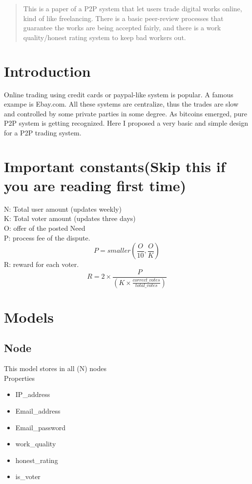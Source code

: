 \documentclass[12pt]{article}
\begin{document}
\maketitle

\begin{abstract}
This is a paper of a P2P system that let users trade digital works online, kind of like freelancing. There is a basic peer-review processes that guarantee the works are being accepted fairly, and there is a work quality/honest rating system to keep bad workers out. 
\end{abstract}

\section{Introduction}
Online trading using credit cards or paypal-like system is popular. A famous exampe is Ebay.com. All these systems are centralize, thus the trades are slow and controlled by some private parties in some degree. As bitcoins emerged, pure P2P system is getting recognized. Here I proposed a very basic and simple design for a P2P trading system. 

\section{Important constants(Skip this if you are reading first time)}
N: Total user amount (updates weekly)\\
K: Total voter amount (updates three days)\\
O: offer of the posted Need\\
P: process fee of the dispute. 
\[
P = smaller(\frac{O}{10}, \frac{O}{K})
\]
R: reward for each voter. 
\[
R = 2 \times \frac{P}{(K \times \frac{correct\_votes}{total\_votes})}
\]

\section{Models}

\subsection{Node}
This model stores in all (N) nodes\\
Properties
\begin{itemize}
	\item IP\_address
	\item Email\_address
	\item Email\_password
	\item work\_quality
	\item honest\_rating
	\item is\_voter
\end{itemize}
\end{document}
